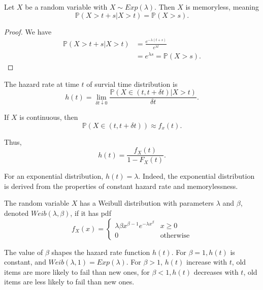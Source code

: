 \begin{prop}
  Let $X$ be a random variable with $X \sim Exp(\lambda)$. Then $X$ is memoryless, meaning
  \[\mathbb{P}(X > t + s | X > t) = \mathbb{P}(X > s).\]
\end{prop}
\begin{proof}
    We have
    \begin{align*}
      \mathbb{P}(X > t + s | X > t) &= \frac{e^{- \lambda(t + s)}}{e^{\lambda t}} \\
                                    &= e^{\lambda s} = \mathbb{P}(X > s)
    .\end{align*}
\end{proof}

\begin{definition}
    The hazard rate at time $t$ of survial time distribution is
    \[h(t) = \lim_{\delta t \downarrow 0} \frac{\mathbb{P}(X \in (t, t + \delta t) | X > t)}{\delta t} .\]

    If $X$ is continuous, then
    \[\mathbb{P}(X \in (t, t + \delta t)) \approx f_x(t).\]

    Thus,
    \[h(t) = \frac{f_X(t)}{1 - F_X(t)}.\]

    \noindent For an exponential distribution, $h(t) = \lambda$. Indeed, the exponential distribution is derived from the properties of constant hazard rate and memorylessness.
\end{definition}

\begin{definition}
    The random variable $X$ has a Weibull distribution with parameters $\lambda$ and $\beta$, denoted $Weib(\lambda, \beta)$, if it has pdf
    \[f_X(x) = \left\{
    \begin{array}{lr}
      \lambda \beta x^{\beta - 1} e^{- \lambda x^\beta} & x \geq 0\\
      0 & \text{otherwise}
    \end{array}
\right.\]

    The value of $\beta$ shapes the hazard rate function $h(t)$. For $\beta = 1, h(t)$ is constant, and $Weib(\lambda, 1) = Exp(\lambda)$. For $\beta > 1$, $h(t)$ increase with $t$, old items are more likely to fail than new ones, for $\beta < 1, h(t)$ decreases with $t$, old items are less likely to fail than new ones.

\end{definition}

